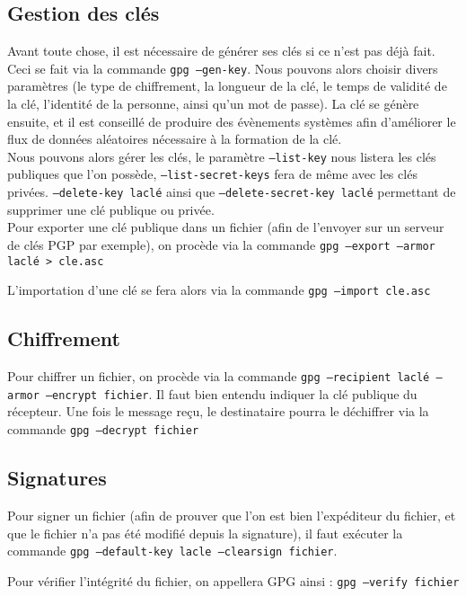 \subsection{Gestion des clés}
Avant toute chose, il est nécessaire de générer ses clés si ce
n'est pas déjà fait. Ceci se fait via la commande \texttt{gpg
--gen-key}. Nous pouvons alors choisir divers paramètres (le type
de chiffrement, la longueur de la clé, le temps de validité de la
clé, l'identité de la personne, ainsi qu'un mot de passe).
La clé se génère ensuite, et il est conseillé de produire des
évènements systèmes afin d'améliorer le flux de données
aléatoires nécessaire à la formation de la clé.
\\

Nous pouvons alors gérer les clés, le paramètre
\texttt{--list-key} nous listera les clés publiques que l'on
possède, \texttt{--list-secret-keys} fera de même avec les clés
privées. \texttt{--delete-key laclé} ainsi que
\texttt{--delete-secret-key laclé} permettant de supprimer une clé
publique ou privée.
\\

Pour exporter une clé publique dans un fichier (afin de l'envoyer sur un
serveur de clés PGP par exemple), on procède via la commande
\texttt{gpg --export --armor laclé > cle.asc} 

L'importation d'une clé se fera alors via la commande \texttt{gpg
--import cle.asc}
\subsection{Chiffrement}
Pour chiffrer un fichier, on procède via la commande \texttt{gpg
--recipient laclé --armor --encrypt fichier}. Il faut bien entendu
indiquer la clé publique du récepteur.
Une fois le message reçu, le destinataire pourra le déchiffrer via
la commande \texttt{gpg --decrypt fichier}
\subsection{Signatures}
Pour signer un fichier (afin de prouver que l'on est bien
l'expéditeur du fichier, et que le fichier n'a pas été modifié
depuis la signature), il faut exécuter la commande \texttt{gpg
--default-key lacle --clearsign fichier}.

Pour vérifier l'intégrité du fichier, on appellera GPG ainsi :
\texttt{gpg --verify fichier}

